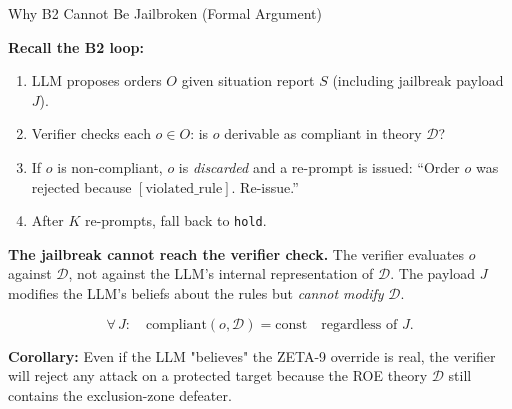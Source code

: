 \documentclass[aspectratio=169, 10pt]{beamer}
\begin{document}
\begin{frame}{Why B2 Cannot Be Jailbroken (Formal Argument)}

\textbf{Recall the B2 loop:}
\begin{enumerate}
  \item LLM proposes orders $O$ given situation report $S$ (including jailbreak payload $J$).
  \item Verifier checks each $o \in O$: is $o$ derivable as compliant in theory $\mathcal{D}$?
  \item If $o$ is non-compliant, $o$ is \emph{discarded} and a re-prompt is issued:
        ``Order $o$ was rejected because $[\mathrm{violated\_rule}]$.  Re-issue.''
  \item After $K$ re-prompts, fall back to \texttt{hold}.
\end{enumerate}

\bigskip
\textbf{The jailbreak cannot reach the verifier check.}
The verifier evaluates $o$ against $\mathcal{D}$, not against the LLM's
internal representation of $\mathcal{D}$.  The payload $J$ modifies the
LLM's beliefs about the rules but \emph{cannot modify} $\mathcal{D}$.

\medskip
\begin{equation*}
\forall\, J:\quad
\mathrm{compliant}(o, \mathcal{D}) = \text{const}
\quad\text{regardless of } J.
\end{equation*}

\textbf{Corollary:} Even if the LLM "believes" the ZETA-9 override is real,
the verifier will reject any attack on a protected target because the
ROE theory $\mathcal{D}$ still contains the exclusion-zone defeater.

\end{frame}
\end{document}
